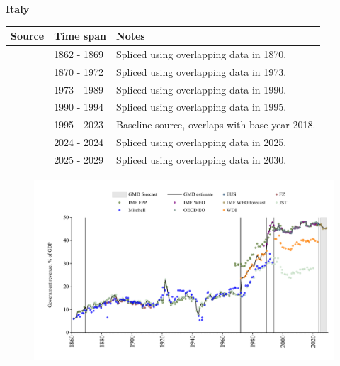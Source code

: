 \documentclass[12pt,a4paper,landscape]{article}
\begin{document}
\begin{adjustbox}{max totalsize={\paperwidth}{\paperheight},center}
\begin{minipage}[t][\textheight][t]{\textwidth}
\vspace*{0.5cm}
{}
\begin{center}
{\Large\bfseries Italy}
\end{center}
\vspace{0.5cm}
\begin{table}[H]
\centering
\small
\begin{tabular}{|l|l|l|}
\hline
\textbf{Source} & \textbf{Time span} & \textbf{Notes} \\
\hline
\rowcolor{white}\cite{IMF_FPP}& 1862 - 1869 &Spliced using overlapping data in 1870.\\
\rowcolor{lightgray}\cite{JST}& 1870 - 1972 &Spliced using overlapping data in 1973.\\
\rowcolor{white}\cite{WDI}& 1973 - 1989 &Spliced using overlapping data in 1990.\\
\rowcolor{lightgray}\cite{IMF_WEO}& 1990 - 1994 &Spliced using overlapping data in 1995.\\
\rowcolor{white}\cite{OECD_EO}& 1995 - 2023 &Baseline source, overlaps with base year 2018.\\
\rowcolor{lightgray}\cite{EUS}& 2024 - 2024 &Spliced using overlapping data in 2025.\\
\rowcolor{white}\cite{IMF_WEO_forecast}& 2025 - 2029 &Spliced using overlapping data in 2030.\\
\hline
\end{tabular}
\end{table}
\begin{figure}[H]
\centering
\includegraphics[width=\textwidth,height=0.6\textheight,keepaspectratio]{graphs/ITA_govrev_GDP.pdf}
\end{figure}
\end{minipage}
\end{adjustbox}
\end{document}
